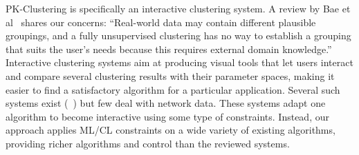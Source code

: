 PK-Clustering is specifically an interactive clustering system. A review by Bae et al~\cite{baeInteractiveClusteringComprehensive2020} shares our concerns:
``Real-world data may contain different plausible groupings, and a fully unsupervised clustering has no way to establish a grouping that suits the user’s needs because this requires external domain knowledge.''
Interactive clustering systems aim at producing visual tools that let users interact and compare several clustering results with their parameter spaces, making it easier to find a satisfactory algorithm for a particular application. Several such systems exist (\eg~\cite{cavalloClustrophileGuidedVisual2019, xclusim}) but few deal with network data.
These systems adapt one algorithm to become interactive using some type of constraints.
Instead, our approach applies ML/CL constraints on a wide variety of existing algorithms, providing richer algorithms and control than the reviewed systems.




